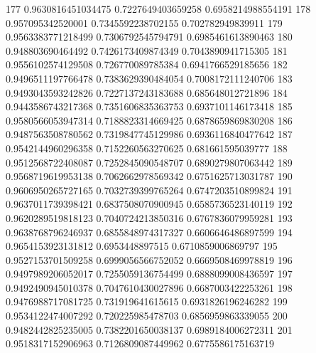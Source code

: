 177	0.9630816451034475	0.7227649403659258	0.6958214988554191
178	0.957095342520001	0.7345592238702155	0.702782949839911
179	0.9563383771218499	0.7306792545794791	0.6985461613890463
180	0.948803690464492	0.7426173409874349	0.7043890941715305
181	0.9556102574129508	0.726770089785384	0.6941766529185656
182	0.9496511197766478	0.7383629390484054	0.7008172111240706
183	0.9493043593242826	0.7227137243183688	0.685648012721896
184	0.9443586743217368	0.7351606835363753	0.6937101146173418
185	0.9580566053947314	0.7188823314669425	0.6878659869830208
186	0.9487563508780562	0.7319847745129986	0.6936116840477642
187	0.9542144960296358	0.7152260563270625	0.681661595039777
188	0.9512568722408087	0.7252845090548707	0.6890279807063442
189	0.9568719619953138	0.7062662978569342	0.6751625713031787
190	0.9606950265727165	0.7032739399765264	0.6747203510899824
191	0.9637011739398421	0.6837508070900945	0.6585736523140119
192	0.9620289519818123	0.7040724213850316	0.6767836079959281
193	0.9638768796246937	0.6855848974317327	0.6606646486897599
194	0.9654153923131812	0.6953448897515	0.6710859006869797
195	0.9527153701509258	0.6999056566752052	0.6669508469978819
196	0.9497989206052017	0.7255059136754499	0.6888099008436597
197	0.9492490945010378	0.7047610430027896	0.6687003422253261
198	0.9476988717081725	0.731919641615615	0.6931826196246282
199	0.9534122474007292	0.720225985478703	0.6856959863339055
200	0.9482442825235005	0.7382201650038137	0.6989184006272311
201	0.9518317152906963	0.7126809087449962	0.6775586175163719